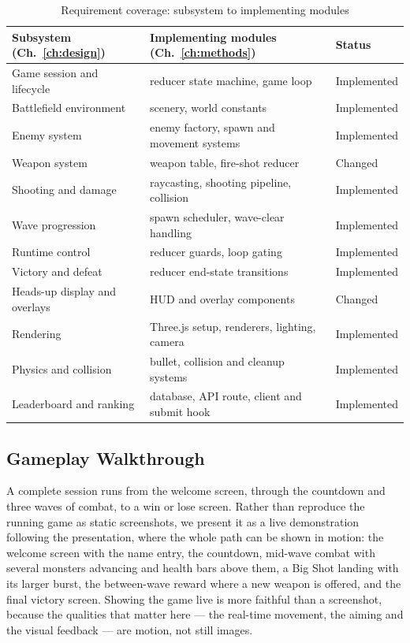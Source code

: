 \documentclass[12pt,a4paper]{report}
\begin{document}
\begin{table}[htbp]
\centering
\caption{Requirement coverage: subsystem to implementing modules}
\label{tab:trace}
\begin{tabular}{|p{4.0cm}|p{5.6cm}|p{2.8cm}|}
\hline
Subsystem (Ch.~\ref{ch:design}) & Implementing modules (Ch.~\ref{ch:methods}) & Status \\
\hline
Game session and lifecycle & reducer state machine, game loop & Implemented \\
\hline
Battlefield environment & scenery, world constants & Implemented \\
\hline
Enemy system & enemy factory, spawn and movement systems & Implemented \\
\hline
Weapon system & weapon table, fire-shot reducer & Changed \\
\hline
Shooting and damage & raycasting, shooting pipeline, collision & Implemented \\
\hline
Wave progression & spawn scheduler, wave-clear handling & Implemented \\
\hline
Runtime control & reducer guards, loop gating & Implemented \\
\hline
Victory and defeat & reducer end-state transitions & Implemented \\
\hline
Heads-up display and overlays & HUD and overlay components & Changed \\
\hline
Rendering & Three.js setup, renderers, lighting, camera & Implemented \\
\hline
Physics and collision & bullet, collision and cleanup systems & Implemented \\
\hline
Leaderboard and ranking & database, API route, client and submit hook & Implemented \\
\hline
\end{tabular}
\end{table}

\subsection{Gameplay Walkthrough}

A complete session runs from the welcome screen, through the countdown and three
waves of combat, to a win or lose screen. Rather than reproduce the running game
as static screenshots, we present it as a live demonstration following the
presentation, where the whole path can be shown in motion: the welcome screen
with the name entry, the countdown, mid-wave combat with several monsters
advancing and health bars above them, a Big Shot landing with its larger burst,
the between-wave reward where a new weapon is offered, and the final victory
screen. Showing the game live is more faithful than a screenshot, because the
qualities that matter here --- the real-time movement, the aiming and the visual
feedback --- are motion, not still images.
\end{document}
